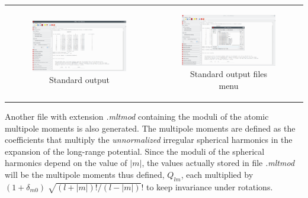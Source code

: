 \documentclass[10pt]{article}
\begin{document}
\begin{center}
\begin{tabular}{cc}
\begin{minipage}{.48\linewidth}
\begin{figure}[H]
\begin{center}
\includegraphics[width=.9\linewidth]{damqt320_standard_output.png}
\end{center}
\caption{{Standard output} \label{fig:2_2_2}}
\end{figure}
\end{minipage}
&
\begin{minipage}{.48\linewidth}
\begin{figure}[H]
\begin{center}
\includegraphics[width=.9\linewidth]{damqt320_output_files_menu.png}
\end{center}
\caption{{Standard output files menu}\label{fig:2_2_3}}
\end{figure}
\end{minipage}
\end{tabular}
\end{center}


Another file with extension {\it .mltmod} containing the moduli of the atomic
multipole moments 
is also generated. The multipole moments are defined
as the coefficients that multiply the {\it unnormalized} irregular spherical harmonics
in the expansion of the long-range potential. Since the moduli of the 
spherical harmonics depend on the value of $|m|$, the values actually stored in file {\it .mltmod}
will be the multipole moments thus defined, $Q_{lm}$, each multiplied by 
$(1 + \delta_{m0}) \; \sqrt{(l+|m|)!/(l-|m|)}!$ to keep
invariance under rotations.
\end{document}
